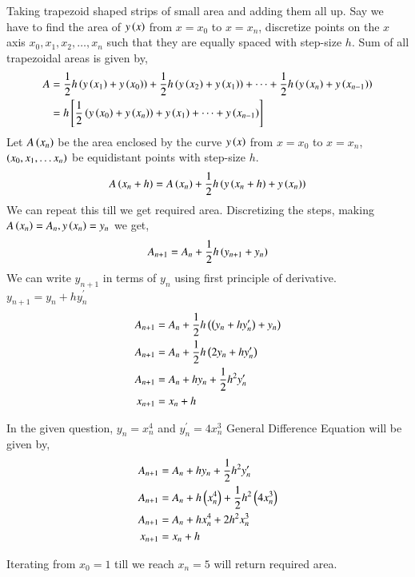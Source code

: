 \documentclass[journal]{IEEEtran}
\begin{document}
Taking trapezoid shaped strips of small area and adding them all up. Say we have to find the area of $y\left(x\right)$ from $x=x_0$ to $x=x_n$, discretize points on the $x$ axis $x_0, x_1, x_2, \dots, x_n$ such that they are equally spaced with step-size $h$. \newline
Sum of all trapezoidal areas is given by,
\begin{align}
  A&=\frac{1}{2}h\left(y\left(x_1\right)+y\left(x_0\right)\right)+ \frac{1}{2}h\left(y\left(x_2\right)+y\left(x_1\right)\right)+\dots+\frac{1}{2}h\left(y\left(x_n\right)+y\left(x_{n-1}\right)\right)\\
  &=h{}\left[\frac{1}{2}\left(y\left(x_0\right)+y\left(x_n\right)\right)+ y\left(x_1\right)+\dots+y\left(x_{n-1}\right)\right]
\end{align}
Let $A\left(x_n\right)$ be the area enclosed by the curve $y\left(x\right)$ from $x=x_0$ to $x=x_n$, $\left(x_0, x_1, \dots x_n\right)$ be equidistant points with step-size $h$.
\begin{align}
  A\left(x_n+h\right)=A\left(x_n\right)+\frac{1}{2}h\left(y\left(x_n+h\right)+y\left(x_n\right)\right)
\end{align}
We can repeat this till we get required area.\newline
Discretizing the steps, making $A\left(x_n\right)=A_n, y\left(x_n\right)=y_n$ we get,
\begin{align}
 A_{n+1}=A_n+\frac{1}{2}h\left(y_{n+1}+y_n\right)
\end{align}
We can write $y_{n+1}$ in terms of $y_n$ using first principle of derivative. $y_{n+1}=y_n+hy^{\prime}_n$
\begin{align}
  A_{n+1}&=A_n+\frac{1}{2}h\left(\left(y_{n}+hy^{\prime}_n\right)+y_n\right)\\
  A_{n+1}&=A_n+\frac{1}{2}h\left(2y_n+hy^{\prime}_n\right)\\
  A_{n+1}&=A_n+hy_n+\frac{1}{2}h^2y^{\prime}_n\\
  x_{n+1}&=x_n+h
\end{align}

In the given question, $y_n=x_n^4$ and $y^{\prime}_n=4x_n^3$\newline
General Difference Equation will be given by,
\begin{align}
    A_{n+1}&=A_n+hy_n+\frac{1}{2}h^2y^{\prime}_n\\
    A_{n+1}&=A_n+h\left(x_n^4\right)+\frac{1}{2}h^2\left(4x_n^3\right)\\
    A_{n+1}&=A_n+hx_n^4+2h^2x_n^3\\
    x_{n+1}&=x_n+h
\end{align}

Iterating from $x_{0} = 1$ till we reach $x_n=5$ will return required area.
\end{document}
